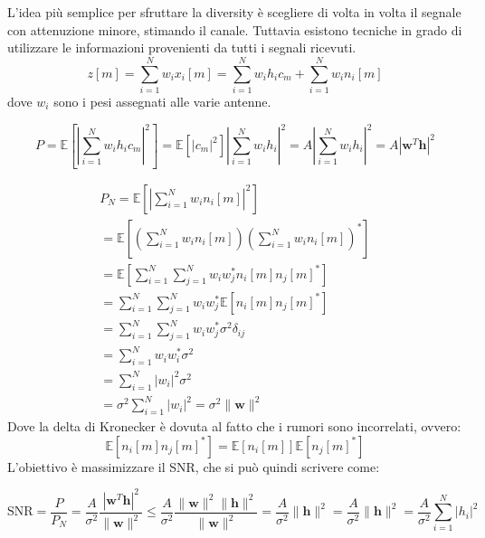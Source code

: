 L'idea più semplice per sfruttare la diversity è scegliere di volta in volta il segnale con attenuzione minore, stimando il canale.
Tuttavia esistono tecniche in grado di utilizzare le informazioni provenienti da tutti i segnali ricevuti.
\[
    z[m] = \sum_{i=1}^{N} w_i x_i[m] = \sum_{i=1}^{N} w_i h_i c_m + \sum_{i=1}^{N} w_i n_i[m]
\]
dove $w_i$ sono i pesi assegnati alle varie antenne.


\[
    P = \mathbb{E} \left[ \left| \sum_{i=1}^{N} w_i h_i c_m  \right|^2 \right] = \mathbb{E} \left[  |c_m|^2  \right] \left| \sum_{i=1}^{N} w_i h_i \right|^2 = A \left| \sum_{i=1}^{N} w_i h_i \right|^2 = A \left| \mathbf{w}^T \mathbf{h} \right|^2
\]

\[
    \begin{array}{ll}
            P_N = \mathbb{E} \left[ \left| \sum_{i=1}^{N} w_i n_i[m]  \right|^2 \right] \\
            = \mathbb{E} \left[ \left( \sum_{i=1}^{N} w_i n_i[m] \right)  \left( \sum_{i=1}^{N} w_i n_i[m] \right)^*  \right] \\
            = \mathbb{E} \left[  \sum_{i=1}^{N} \sum_{j=1}^{N} w_i w_j^* n_i[m] n_j[m]^*  \right] \\
            = \sum_{i=1}^{N} \sum_{j=1}^{N} w_i w_j^* \mathbb{E} \left[ n_i[m] n_j[m]^* \right] \\
            = \sum_{i=1}^{N} \sum_{j=1}^{N} w_i w_j^* \sigma^2 \delta_{ij} \\
            = \sum_{i=1}^{N} w_i w_i^* \sigma^2 \\
            = \sum_{i=1}^{N} |w_i|^2 \sigma^2 \\
            = \sigma^2 \sum_{i=1}^{N} |w_i|^2 = \sigma^2 \|\mathbf{w}\|^2
    \end{array}
\]
Dove la delta di Kronecker è dovuta al fatto che i rumori sono incorrelati, ovvero:
\[
    \mathbb{E} \left[ n_i[m] n_j[m]^* \right] = \mathbb{E} \left[ n_i[m] \right] \mathbb{E} \left[ n_j[m]^* \right]
\]
L'obiettivo è massimizzare il SNR, che si può quindi scrivere come:

\[
    \text{SNR} = \frac{P}{P_N} = \frac{A}{\sigma^2} \frac{\left| \mathbf{w}^T \mathbf{h} \right|^2}{\|\mathbf{w}\|^2} \leq \frac{A}{\sigma^2} \frac{\|\mathbf{w}\|^2 \|\mathbf{h}\|^2}{\|\mathbf{w}\|^2} = \frac{A}{\sigma^2} \|\mathbf{h}\|^2 = \frac{A}{\sigma^2} \|\mathbf{h}\|^2 =  \frac{A}{\sigma^2} \sum_{i=1}^{N} |h_i|^2
\]




